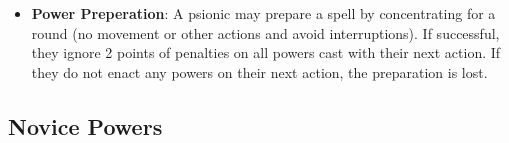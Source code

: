 \documentclass[10pt,twoside]{article}
\begin{document}
\begin{multicols}{2}
\begin{itemize}
            \item \textbf{Power Preperation}: A psionic may prepare a spell by concentrating for a round (no movement or other actions and avoid interruptions). If successful, they ignore 2 points of penalties on all powers cast with their next action. If they do not enact any powers on their next action, the preparation is lost.

        \end{itemize}

    \end{multicols}

    \subsection{Novice Powers}

    \newenvironment{powertable}{\rowcolors{2}{bgtan}{commentgreen}\longtable} {
    \endlongtable}
\end{document}
